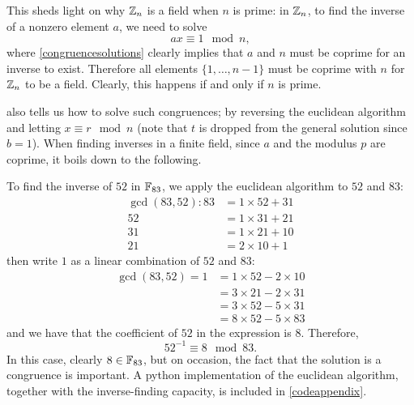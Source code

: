 This sheds light on why $\zn$ is a field when $n$ is prime: in $\zn$, to find the inverse of a nonzero element $a$, we need to solve
$$ax \equiv 1 \mod n,$$
where \cref{congruencesolutions} clearly implies that $a$ and $n$ must be coprime for an inverse to exist.
Therefore all elements $\{1,\ldots,n-1\}$ must be coprime with $n$ for $\zn$ to be a field.
Clearly, this happens if and only if $n$ is prime.

 also tells us how to solve such congruences; by reversing the euclidean algorithm and letting $x \equiv r \mod n$ (note that $t$ is dropped from the general solution since $b = 1$). %
When finding inverses in a finite field, since $a$ and the modulus $p$ are coprime, it boils down to the following.

To find the inverse of $52$ in $\fp[83]$, we apply the euclidean algorithm to $52$ and $83$:
\begin{align*}
	\gcd(83,52): 83 &= 1 \times 52 + 31\\
	52 &= 1 \times 31 + 21\\
	31 &= 1 \times 21 + 10\\
	21 &= 2 \times 10 + 1
\end{align*}
then write $1$ as a linear combination of $52$ and $83$:
\begin{align*}
	\gcd(83,52) = 1 &= 1 \times 52 - 2 \times 10 \\
	&= 3 \times 21 - 2 \times 31 \\
	&= 3 \times 52 - 5 \times 31 \\
	&= 8 \times 52 - 5 \times 83 
\end{align*}
and we have that the coefficient of $52$ in the expression is $8$. Therefore,
$$52^{-1} \equiv 8 \mod 83.$$
In this case, clearly $8 \in \fp[83]$, but on occasion, the fact that the solution is a congruence is important.
A python implementation of the euclidean algorithm, together with the inverse-finding capacity, is included in \cref{codeappendix}.
